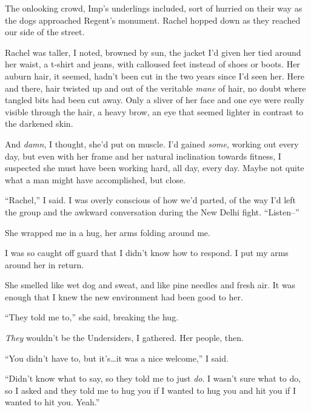 The onlooking crowd, Imp's underlings included, sort of hurried on their way as the dogs approached Regent's monument.  Rachel hopped down as they reached our side of the street.



Rachel was taller, I noted, browned by sun, the jacket I'd given her tied around her waist, a t-shirt and jeans, with calloused feet instead of shoes or boots.  Her auburn hair, it seemed, hadn't been cut in the two years since I'd seen her.  Here and there, hair twisted up and out of the veritable \emph{mane} of hair, no doubt where tangled bits had been cut away.  Only a sliver of her face and one eye were really visible through the hair, a heavy brow, an eye that seemed lighter in contrast to the darkened skin.



And \emph{damn}, I thought, she'd put on muscle.  I'd gained \emph{some}, working out every day, but even with her frame and her natural inclination towards fitness, I suspected she must have been working hard, all day, every day.  Maybe not quite what a man might have accomplished, but close.



``Rachel,'' I said.  I was overly conscious of how we'd parted, of the way I'd left the group and the awkward conversation during the New Delhi fight.  ``Listen--''



She wrapped me in a hug, her arms folding around me.



I was so caught off guard that I didn't know how to respond.  I put my arms around her in return.



She smelled like wet dog and sweat, and like pine needles and fresh air.  It was enough that I knew the new environment had been good to her.



``They told me to,'' she said, breaking the hug.



\emph{They} wouldn't be the Undersiders, I gathered.  Her people, then.



``You didn't have to, but it's\ldots it was a nice welcome,'' I said.



``Didn't know what to say, so they told me to just \emph{do}.  I wasn't sure what to do, so I asked and they told me to hug you if I wanted to hug you and hit you if I wanted to hit you.  Yeah.''



